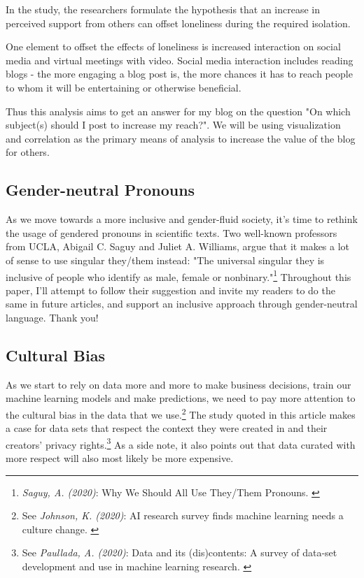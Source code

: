 In the study, the researchers formulate the hypothesis that an increase in perceived support from others can offset loneliness during the required isolation.

One element to offset the effects of loneliness is increased interaction on social media and virtual meetings with video. Social media interaction includes reading blogs - the more engaging a blog post is, the more chances it has to reach people to whom it will be entertaining or otherwise beneficial.

Thus this analysis aims to get an answer for my blog on the question "On which subject(s) should I post to increase my reach?". We will be using visualization and correlation as the primary means of analysis to increase the value of the blog for others.

\subsection{Gender-neutral Pronouns}

As we move towards a more inclusive and gender-fluid society, it's time to rethink the usage of gendered pronouns in scientific texts. Two well-known professors from UCLA, Abigail C. Saguy and Juliet A. Williams, argue that it makes a lot of sense to use singular they/them instead: "The universal singular they is inclusive of people who identify as male, female or nonbinary."\footnote{\textit{Saguy, A. (2020)}: Why We Should All Use They/Them Pronouns. \cite{pronouns}} Throughout this paper, I'll attempt to follow their suggestion and invite my readers to do the same in future articles, and support an inclusive approach through gender-neutral language. Thank you!

\subsection{Cultural Bias}

As we start to rely on data more and more to make business decisions, train our machine learning models and make predictions, we need to pay more attention to the cultural bias in the data that we use.\footnote{See \textit{Johnson, K. (2020)}: AI research survey finds machine learning needs a culture change. \cite{aiResearch}} The study quoted in this article makes a case for data sets that respect the context they were created in and their creators' privacy rights.\footnote{See \textit{Paullada, A. (2020)}: Data and its (dis)contents: A survey of data-set development and use in machine learning research. \cite{cornellStudy}} As a side note, it also points out that data curated with more respect will also most likely be more expensive.

